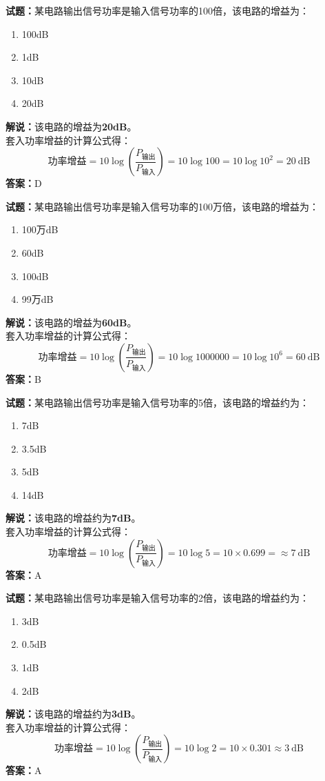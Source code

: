 \documentclass{ctexbook}
\begin{document}
\noindent\textbf{试题：}某电路输出信号功率是输入信号功率的100倍，该电路的增益为：
\begin{enumerate}[leftmargin=3em]
\item 100dB
\item 1dB
\item 10dB
\item 20dB
\end{enumerate}
\noindent\textbf{解说：}该电路的增益为\textbf{20dB}。\\
套入功率增益的计算公式得：
$$\mbox{功率增益}=10 \log \left( {\frac{P_{ \mbox{输出} }}{P_{ \mbox{输入} }}} \right)=10 \log 100 = 10 \log 10^2 = 20 \ \mathrm{dB}$$
\noindent\textbf{答案：}D



\bigskip


\noindent\textbf{试题：}某电路输出信号功率是输入信号功率的100万倍，该电路的增益为：
\begin{enumerate}[leftmargin=3em]
\item 100万dB
\item 60dB
\item 100dB
\item 99万dB
\end{enumerate}
\noindent\textbf{解说：}该电路的增益为\textbf{60dB}。\\
套入功率增益的计算公式得：
$$\mbox{功率增益}=10 \log \left( {\frac{P_{ \mbox{输出} }}{P_{ \mbox{输入} }}} \right)=10 \log 1000000 = 10 \log 10^6 = 60 \ \mathrm{dB}$$
\noindent\textbf{答案：}B




\bigskip


\noindent\textbf{试题：}某电路输出信号功率是输入信号功率的5倍，该电路的增益约为：
\begin{enumerate}[leftmargin=3em]
\item 7dB
\item 3.5dB
\item 5dB
\item 14dB
\end{enumerate}
\noindent\textbf{解说：}该电路的增益约为\textbf{7dB}。\\
套入功率增益的计算公式得：
$$\mbox{功率增益}=10 \log \left( {\frac{P_{ \mbox{输出} }}{P_{ \mbox{输入} }}} \right)=10 \log 5 = 10 \times 0.699 = \approx 7 \ \mathrm{dB}$$
\noindent\textbf{答案：}A




\bigskip


\noindent\textbf{试题：}某电路输出信号功率是输入信号功率的2倍，该电路的增益约为：
\begin{enumerate}[leftmargin=3em]
\item 3dB
\item 0.5dB
\item 1dB
\item 2dB
\end{enumerate}
\noindent\textbf{解说：}该电路的增益约为\textbf{3dB}。\\
套入功率增益的计算公式得：
$$\mbox{功率增益}=10 \log \left( {\frac{P_{ \mbox{输出} }}{P_{ \mbox{输入} }}} \right)=10 \log 2 = 10 \times 0.301 \approx 3 \ \mathrm{dB}$$
\noindent\textbf{答案：}A
\end{document}
